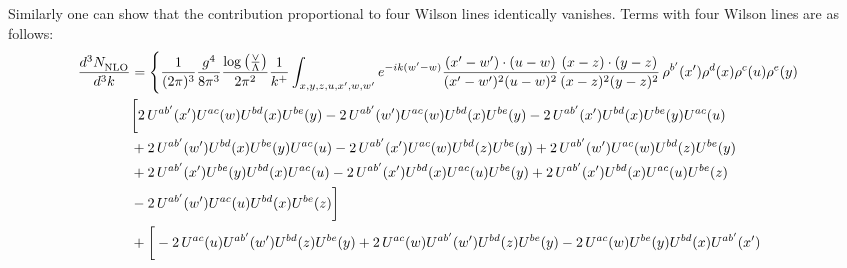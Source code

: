 \documentclass[aps,prd,amsmath,amssymb,nofootinbib]{revtex4-2}
\numberwithin{equation}{section}
\begin{document}
Similarly one can show that the contribution proportional to four Wilson lines identically vanishes. Terms with four Wilson lines are as follows:
\begin{align}
   \frac{d^{3}N_{\rm NLO}^{\rm}}{d^{3}k}  & =  \Bigg\{\frac{1}{(2\pi)^{3}}\frac{g^{4}}{8\pi^{3}}\frac{\log{\left(\frac{\vee}{\Lambda}\right)}}{2\pi^{2}} \frac{1}{k^{+}}\int_{x,y,z,u,x^{\prime},w,w^{\prime}}e^{-ik(w^{\prime}-w)}\frac{(x^{\prime}-w^{\prime})\cdot (u-w)}{(x^{\prime}-w^{\prime})^{2} (u-w)^{2}} \frac{(x-z)\cdot (y-z)}{(x-z)^{2}(y-z)^{2}}\,\rho^{b^{\prime}}(x^{\prime})\rho^{d}(x)\rho^{c}(u)\rho^{e}(y)\notag \\ & \bigg[2\,U^{ab'}(x')U^{ac}(w)U^{bd}(x)U^{be}(y) -2\, U^{ab'}(w')U^{ac}(w)U^{bd}(x)U^{be}(y) - 2\,U^{ab'}(x')U^{bd}(x)U^{be}(y)U^{ac}(u) \notag \\  & + 2\, U^{ab'}(w')U^{bd}(x)U^{be}(y)U^{ac}(u)-2\,U^{ab'}(x')U^{ac}(w)U^{bd}(z)U^{be}(y) + 2\,U^{ab'}(w')U^{ac}(w)U^{bd}(z)U^{be}(y) \notag \\ &+2\,U^{ab'}(x')U^{be}(y)U^{bd}(x)U^{ac}(u) -2\,U^{ab'}(x')U^{bd}(x)U^{ac}(u)U^{be}(y) +2\, U^{ab'}(x')U^{bd}(x)U^{ac}(u)U^{be}(z) \notag \\ & - 2\,U^{ab'}(w')U^{ac}(u)U^{bd}(x)U^{be}(z)\bigg]\notag \\ & + \bigg[-2\,U^{ac}(u)U^{ab'}(w')U^{bd}(z)U^{be}(y) + 2\,U^{ac}(w)U^{ab'}(w')U^{bd}(z)U^{be}(y) - 2\,U^{ac}(w)U^{be}(y)U^{bd}(x)U^{ab'}(x') \notag \\

\end{align}
\end{document}
